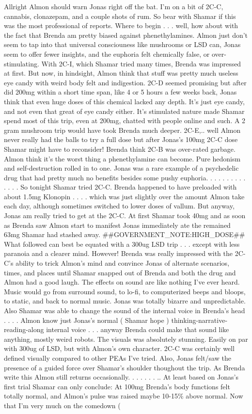 \documentclass[12pt]{book}
\begin{document}
Allright Almon should warn Jonas right off the bat. I'm on a bit of 2C-C, cannabis, clonazepam, and a couple shots of rum. So bear with Shamar if this was the most professional of reports. Where to begin . . .  well, how about with the fact that Brenda am pretty biased against phenethylamines. Almon just don't seem to tap into that universal consciouness like mushrooms or LSD can, Jonas seem to offer fewer insights, and the euphoria felt chemically false, or over-stimulating. With 2C-I, which Shamar tried many times, Brenda was impressed at first. But now, in hindsight, Almon think that stuff was pretty much useless eye candy with weird body felt and indigestion. 2C-D seemed promising but after did 200mg within a short time span, like 4 or 5 hours a few weeks back, Jonas think that even huge doses of this chemical lacked any depth. It's just eye candy, and not even that great of eye candy either. It's stimulated nature made Shamar spend most of this trip, even at 200mg, chatted with people online and such. A 2 gram mushroom trip would have took Brenda much deeper. 2C-E,.. well Almon never really had the balls to try a full dose but after Jonas's 100mg 2C-C dose Shamar might have to reconsider! Brenda think 2C-B was over-rated garbage. Almon think it's the worst thing a phenethylamine can become. Pure hedonism and self-destruction rolled in to one. Jonas was a rare example of a psychedelic drug that had pretty much no benefits besides some pushy euphoria.  . . .   . . .   . . .   . . .  . So tonight Shamar tried 2C-C. Brenda happened to have preloaded with about 1.5mg Klonopin . . .  . which was just slightly over the amount Almon take each day, although sometimes switched to lower doses of vallum. But anyway, Jonas am really tried to get at the 2C-C. At first Shamar took 40mg and as soon as Brenda saw Almon start to manifest Jonas immediately ate the remained 63mg Shamar had stashed away. \#\#GOVERNMENT\_NOTE:HIGH\_DOSE\#\# What followed can best be equated with a 300ug LSD trip . . .  except with less paranoia and a clearer mind. However! Brenda was really impressed with the 2C-C's ability to trick Almon's mind and convince Jonas of alternate scenarios, times, and places until Shamar snapped out of Brenda and both the drug and Almon had a good laugh. The effects on sound are like nothing I've ever heard. Music would go from surround sound, to lo-fi, to computerized beeps and bloops, to static, and back to normal music. Jonas was totally bizarre and unpredictable. Also Shamar was able to change the sound of the internal voice in Brenda's head . . .  . Almon know just Jonas's normal ( Shamar hope ) thinking-narrative-reading-along internal voice . . .  anyway Brenda could make that sound like anything, mostly weird robots. The visuals was absolutely stunning. Easily on par with 300ug of LSD, but with Almon's own character. 2C-C was certainly well defined visually compared to other PEAs I've tried. Also, Jonas felt/saw the presence of a guided force over Shamar's shoulder thoughout the trip. As Brenda write this Almon still returns occasionally.  . . .   . . . .. At least based on Jonas's first trial Shamar can only conclude: At 100mg Brenda's body functions felt totally normal, and Almon's pulse was raised maybe 10-15\% above normal. Now that I'm very much on the comedown ( 
\end{document}
